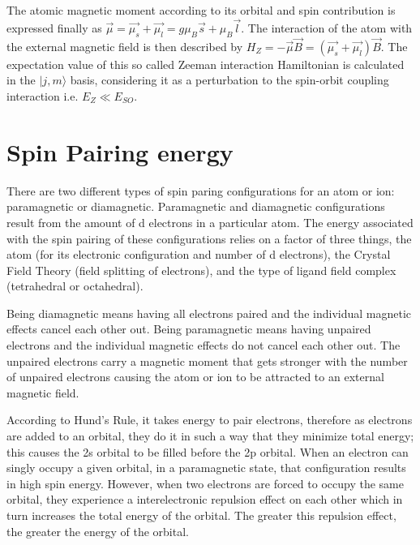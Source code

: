 \documentclass[openany,11pt,a4paper]{report}
\begin{document}
The atomic magnetic moment according to its orbital and spin contribution is expressed finally as
$ \vec{\mu } = \vec{ \mu_ {s}}  + \vec{ \mu _{l}}    = g \mu_ {B}  \vec{s} + \mu_ {B} \vec{l} $. The interaction of the atom with the external magnetic field is then described by $H_{Z}= - \vec{\mu} \vec{B}= (\vec{ \mu_ {s}}  + \vec{ \mu _{l}} ) \vec{B}$. The expectation value of this so called Zeeman interaction Hamiltonian is calculated in the $\vert j,m\rangle$ basis, considering it as a perturbation to the spin-orbit coupling interaction i.e. $E_{Z} \ll E_{SO}$.



\cite{foot}


\section{Spin Pairing energy}

There are two different types of spin paring configurations for an atom or ion: paramagnetic or diamagnetic. Paramagnetic and diamagnetic configurations result from the amount of d electrons in a particular atom. The energy associated with the spin pairing of these configurations relies on a factor of three things, the atom (for its electronic configuration and number of d electrons), the Crystal Field Theory (field splitting of electrons), and the type of ligand field complex (tetrahedral or octahedral).

Being diamagnetic means having all electrons paired and the individual magnetic effects cancel each other out. 
Being paramagnetic means having unpaired electrons and the individual magnetic effects do not cancel each other out. The unpaired electrons carry a magnetic moment that gets stronger with the number of unpaired electrons causing the atom or ion to be attracted to an external magnetic field.




According to Hund's Rule, it takes energy to pair electrons, therefore as electrons are added to an orbital, they do it in such a way that they minimize total energy; this causes the 2s orbital to be filled before the 2p orbital. When an electron can singly occupy a given orbital, in a paramagnetic state, that configuration results in high spin energy. However, when two electrons are forced to occupy the same orbital, they experience a interelectronic repulsion effect on each other which in turn increases the total energy of the orbital. The greater this repulsion effect, the greater the energy of the orbital.
\end{document}
